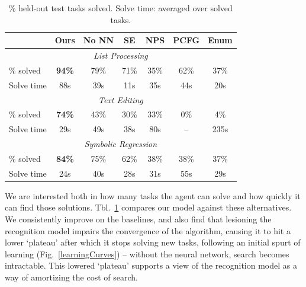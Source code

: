 \documentclass{article}
\newcommand{\expect}{\mathds{E}} %
\newcommand{\probability}{\mathds{P}} %
\begin{document}
\begin{table}
\vspace{-10pt}
\tabcolsep=2.5pt
\renewcommand{\arraystretch}{0.5}
\begin{tabular}{lcccccc}
  \toprule& Ours& 
    No NN & SE&NPS & PCFG & Enum \\
  \midrule
  \multicolumn{7}{c}{\emph{List Processing}}\\
  \midrule
  \% solved&\textbf{94\%} & 
  79\% &71\%&35\%&62\%&37\%\\
  Solve time&  88s&39s&11s&35s&44s&20s\\
  \midrule
  \multicolumn{7}{c}{\emph{Text Editing}}\\
  \midrule
  \% solved&\textbf{74\%} &43\% &30\%&33\%&0\%&4\%\\
  Solve time& 29s&49s %
  &38s&80s&--&235s\\
  \midrule
  \multicolumn{7}{c}{\emph{Symbolic Regression}}\\
  \midrule
  \% solved&   \textbf{84\% }&75\%&62\%&38\%&38\%&37\% \\
  Solve time&  24s& 40s  &28s&31s&55s&29s\\
  \bottomrule
  \end{tabular}
\caption{\% held-out test tasks solved. Solve time: averaged over solved
  tasks.  %
}\vspace{-1cm}\label{baselineComparisons} \end{table}
We are interested both in how many tasks the
agent can solve and how quickly it can find those solutions.
Tbl.~\ref{baselineComparisons}
compares our model against these alternatives.
We consistently
improve on the baselines,
and also find that lesioning the recognition model
impairs the convergence of the algorithm,
causing it to hit a lower `plateau' after which it stops solving new tasks, following an initial spurt of learning (Fig.~\ref{learningCurves}) -- without the neural network, search becomes intractable.
This lowered `plateau' supports a view of the recognition model as a way of amortizing the cost of search.
\end{document}
